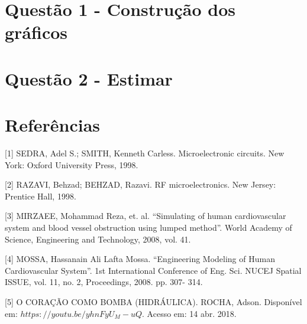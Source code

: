 \documentclass{abntex2}
\begin{document}
\section{Questão 1 - Construção dos gráficos}


\section{Questão 2 - Estimar \Beta}



\section*{Referências}


[1] SEDRA, Adel S.; SMITH, Kenneth Carless. Microelectronic circuits. New York: Oxford University Press, 1998.

[2] RAZAVI, Behzad; BEHZAD, Razavi. RF microelectronics. New Jersey: Prentice Hall, 1998.

[3] MIRZAEE, Mohammad Reza, et. al. “Simulating of human cardiovascular system and blood vessel
obstruction using lumped method”. World Academy of Science, Engineering and Technology, 2008, vol.
41.

[4] MOSSA, Hassanain Ali Lafta Mossa. “Engineering Modeling of Human Cardiovascular System”. 1st
International Conference of Eng. Sci. NUCEJ Spatial ISSUE, vol. 11, no. 2, Proceedings, 2008. pp. 307-
314.

[5] O CORAÇÃO COMO BOMBA (HIDRÁULICA). ROCHA,  Adson. Disponível em: $https://youtu.be/yhnFyU_M-uQ$. Acesso em: 14 abr. 2018.
\end{document}
